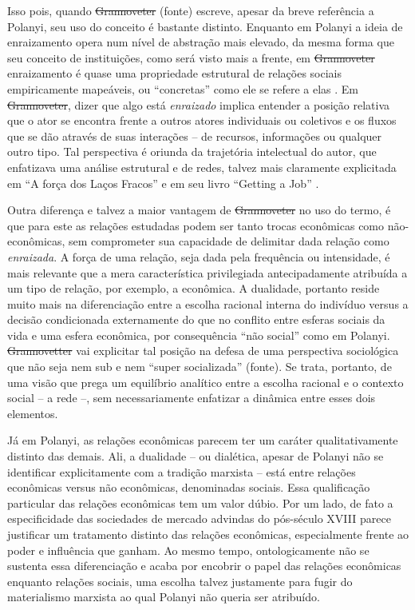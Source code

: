 Isso pois, quando \sout{Grannoveter} (fonte) escreve, apesar da breve referência a Polanyi, seu uso do conceito é bastante distinto. Enquanto em Polanyi
a ideia de enraizamento opera num nível de abstração mais elevado, da
mesma forma que seu conceito de instituições, como será visto mais a frente, em \sout{Grannoveter} enraizamento é quase uma propriedade estrutural
de relações sociais empiricamente mapeáveis, ou ``concretas'' como ele se refere a elas . Em \sout{Grannoveter}, dizer que algo
está \emph{enraizado} implica entender a posição relativa que o ator se
encontra frente a outros atores individuais ou coletivos e os fluxos
que se dão através de suas interações -- de recursos, informações ou
qualquer outro tipo. Tal perspectiva é oriunda da trajetória
intelectual do autor, que enfatizava uma análise estrutural e de redes, talvez
mais claramente explicitada em ``A força dos Laços Fracos''  e em seu livro ``Getting a Job'' .

Outra diferença e talvez a maior vantagem de \sout{Grannoveter} no uso do termo, é que para este as relações estudadas podem ser tanto
trocas econômicas como não-econômicas, sem comprometer sua capacidade de delimitar dada relação como \emph{enraizada}. A força de uma relação, seja dada pela frequência ou intensidade, é mais relevante que a mera característica privilegiada antecipadamente atribuída a um tipo de relação, por exemplo, a econômica. A dualidade, portanto reside muito mais na
diferenciação entre a escolha racional interna do indivíduo versus
a decisão condicionada externamente do que no conflito entre esferas sociais da vida e uma esfera econômica, por consequência ``não social'' como em Polanyi. \sout{Grannovetter} vai explicitar tal posição
na defesa de uma perspectiva sociológica que não seja nem sub e nem
``super socializada'' (fonte). Se trata, portanto, de uma visão que prega um equilíbrio analítico entre a escolha racional e o contexto social -- a rede --,
sem necessariamente enfatizar a dinâmica entre esses dois elementos.

Já em Polanyi, as relações econômicas parecem ter um caráter qualitativamente distinto das demais. Ali, a dualidade -- ou dialética, apesar de Polanyi não se identificar explicitamente
com a tradição marxista -- está entre relações econômicas versus não econômicas, denominadas sociais. Essa qualificação particular das
relações econômicas tem um valor dúbio. Por um lado, de fato a especificidade das sociedades de mercado advindas do pós-século XVIII
parece justificar um tratamento distinto das relações econômicas, especialmente frente ao poder e influência que ganham. Ao mesmo tempo, ontologicamente não se sustenta essa diferenciação e acaba por encobrir o papel das relações econômicas
enquanto relações sociais, uma escolha talvez justamente para fugir do materialismo marxista ao qual Polanyi não queria ser atribuído.

